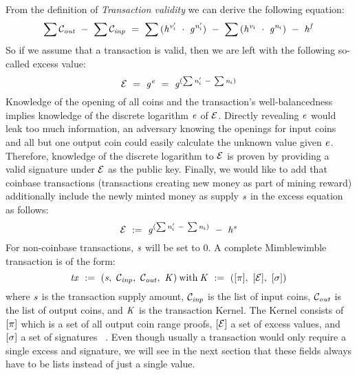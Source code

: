 From the definition of \emph{Transaction validity} we can derive the following equation:
\[ \sum{\mathcal{C}_{\mathit{out}}} ~-~ \sum{\mathcal{C}_{\mathit{inp}}} ~=~ \sum{(\mathit{h}^{\mathit{v}'_i} ~\cdot~\mathit{g}^{\mathit{n}'_i})} ~-~ \sum{(\mathit{h}^{\mathit{v}_i} ~\cdot~\mathit{g}^{\mathit{n}_i})} ~-~ \mathit{h}^{\mathit{f}} \]
So if we assume that a transaction is valid, then we are left with the following so-called excess value:
\[ \mathcal{E} ~=~ \mathit{g}^{\mathit{e}} ~=~ \mathit{g}^{(\sum{\mathit{n}'_i} ~-~ \sum{\mathit{n}_i})} \]
Knowledge of the opening of all coins and the transaction's well-balancedness implies knowledge of the discrete logarithm $\mathit{e}$ of $\mathcal{E}$.
Directly revealing $\mathit{e}$ would leak too much information, an adversary knowing the openings for input coins and all but one output coin could easily calculate the unknown value given $\mathit{e}$.
Therefore, knowledge of the discrete logarithm to $\mathcal{E}$ is proven by providing a valid signature under $\mathcal{E}$ as the public key.
Finally, we would like to add that coinbase transactions (transactions creating new money as part of mining reward) additionally include the newly minted money as supply $\mathit{s}$ in the excess equation as follows:
\[ \mathcal{E} ~:=~ \mathit{g}^{(\sum{\mathit{n}'_i} ~-~ \sum{\mathit{n}_i})} ~-~ \mathit{h}^{\mathit{s}} \]
For non-coinbase transactions, $\mathit{s}$ will be set to 0.
A complete Mimblewimble transaction is of the form:
\[ \mathit{tx} ~:=~ (\mathit{s} ,~ \mathcal{C}_{\mathit{inp}} ,~ \mathcal{C}_{\mathit{out}} ,~ \mathit{K})\:\text{with}\:\mathit{K} ~:=~ ([\pi] ,~ [\mathcal{E}] ,~ [\sigma]) \]
where $\mathit{s}$ is the transaction supply amount, $\mathcal{C}_{\mathit{inp}}$ is the list of input coins, $\mathcal{C}_{\mathit{out}}$ is the list of output coins, and $\mathit{K}$ is the transaction Kernel.
The Kernel consists of $[\pi]$ which is a set of all output coin range proofs, $[\mathcal{E}]$ a set of excess values, and $[\sigma]$ a set of signatures ~\cite{fuchsbauer2019aggregate}.
Even though usually a transaction would only require a single excess and signature, we will see in the next section that these fields always have to be lists instead of just a single value.

